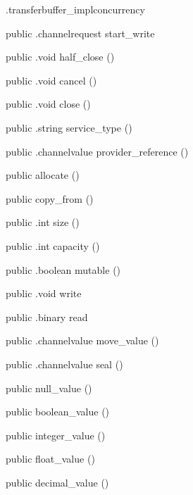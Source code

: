 \begin{CrexxClass}{.transferbuffer\_impl}{concurrency}
\begin{Members}
    \Method
      {public}
      {.channelrequest}
      {start\_write}
      {}

    \Method
      {public}
      {.void}
      {half\_close}
      {()}

    \Method
      {public}
      {.void}
      {cancel}
      {()}

    \Method
      {public}
      {.void}
      {close}
      {()}

    \Method
      {public}
      {.string}
      {service\_type}
      {()}

    \Method
      {public}
      {.channelvalue}
      {provider\_reference}
      {()}

    \Factory
      {public}
      {allocate}
      {()}

    \Factory
      {public}
      {copy\_from}
      {()}

    \Method
      {public}
      {.int}
      {size}
      {()}

    \Method
      {public}
      {.int}
      {capacity}
      {()}

    \Method
      {public}
      {.boolean}
      {mutable}
      {()}

    \Method
      {public}
      {.void}
      {write}
      {}

    \Method
      {public}
      {.binary}
      {read}
      {}

    \Method
      {public}
      {.channelvalue}
      {move\_value}
      {()}

    \Method
      {public}
      {.channelvalue}
      {seal}
      {()}

    \Factory
      {public}
      {null\_value}
      {()}

    \Factory
      {public}
      {boolean\_value}
      {()}

    \Factory
      {public}
      {integer\_value}
      {()}

    \Factory
      {public}
      {float\_value}
      {()}

    \Factory
      {public}
      {decimal\_value}
      {()}


\end{Members}
\end{CrexxClass}
